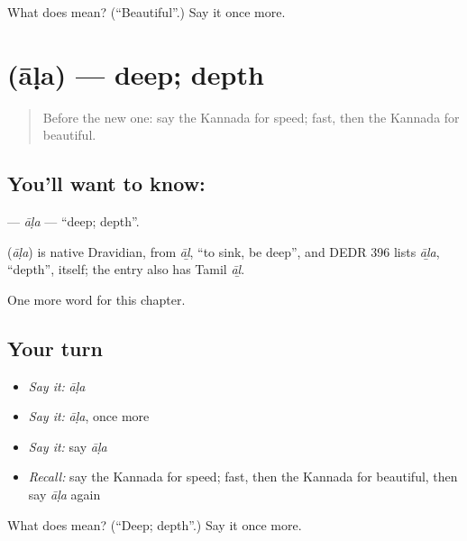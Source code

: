 \begin{tcolorbox}[breakable,colback=teal!4,colframe=teal!35!black,title={Before you move on}]
What does  mean? (\textquotedblleft{}Beautiful\textquotedblright{}.) Say it once more.
\end{tcolorbox}
\section[\texorpdfstring{\kn{ಆಳ} (āḷa)}{ಆಳ (āḷa)}]{ (āḷa) — deep; depth}

\label{lesson:KA-C142-ala}



\begin{quote}
Before the new one: say the Kannada for speed; fast, then the Kannada for beautiful.
\end{quote}

\subsection*{You'll want to know: }
\textbf{} — \emph{āḷa} — \textquotedblleft{}deep; depth\textquotedblright{}.

\begin{cousinweb}
\textbf{} (\emph{āḷa}) is native Dravidian, from \emph{āḻ}, \textquotedblleft{}to sink, be deep\textquotedblright{}, and DEDR 396 lists \emph{āḻa}, \textquotedblleft{}depth\textquotedblright{}, itself; the entry also has Tamil \emph{āḻ}.
\end{cousinweb}

\begin{grammarlens}[title={What you've built}]
One more word for this chapter.
\end{grammarlens}

\subsection*{Your turn}
\begin{itemize}
\raggedright
  \item \emph{Say it:} \emph{āḷa}
  \item \emph{Say it:} \emph{āḷa}, once more
  \item \emph{Say it:} say \emph{āḷa}
  \item \emph{Recall:} say the Kannada for speed; fast, then the Kannada for beautiful, then say \emph{āḷa} again
\end{itemize}

\begin{tcolorbox}[breakable,colback=teal!4,colframe=teal!35!black,title={Before you move on}]
What does  mean? (\textquotedblleft{}Deep; depth\textquotedblright{}.) Say it once more.
\end{tcolorbox}

